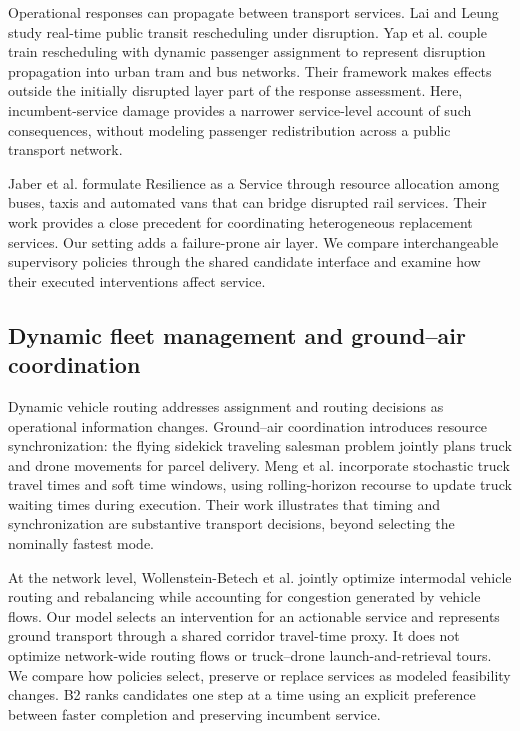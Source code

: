 \documentclass[]{interact}
\theoremstyle{plain}
\theoremstyle{definition}
\theoremstyle{remark}
\begin{document}
Operational responses can propagate between transport services. Lai and Leung study real-time public transit rescheduling under disruption. \citep{ref5} Yap et al. couple train rescheduling with dynamic passenger assignment to represent disruption propagation into urban tram and bus networks. \citep{ref19} Their framework makes effects outside the initially disrupted layer part of the response assessment. Here, incumbent-service damage provides a narrower service-level account of such consequences, without modeling passenger redistribution across a public transport network.

Jaber et al. formulate Resilience as a Service through resource allocation among buses, taxis and automated vans that can bridge disrupted rail services. \citep{ref20} Their work provides a close precedent for coordinating heterogeneous replacement services. Our setting adds a failure-prone air layer. We compare interchangeable supervisory policies through the shared candidate interface and examine how their executed interventions affect service.

\subsection{Dynamic fleet management and ground--air coordination}

Dynamic vehicle routing addresses assignment and routing decisions as operational information changes. \citep{ref4} Ground--air coordination introduces resource synchronization: the flying sidekick traveling salesman problem jointly plans truck and drone movements for parcel delivery. \citep{ref6} Meng et al. incorporate stochastic truck travel times and soft time windows, using rolling-horizon recourse to update truck waiting times during execution. \citep{ref21} Their work illustrates that timing and synchronization are substantive transport decisions, beyond selecting the nominally fastest mode.

At the network level, Wollenstein-Betech et al. jointly optimize intermodal vehicle routing and rebalancing while accounting for congestion generated by vehicle flows. \citep{ref22} Our model selects an intervention for an actionable service and represents ground transport through a shared corridor travel-time proxy. It does not optimize network-wide routing flows or truck--drone launch-and-retrieval tours. We compare how policies select, preserve or replace services as modeled feasibility changes. B2 ranks candidates one step at a time using an explicit preference between faster completion and preserving incumbent service.
\end{document}
